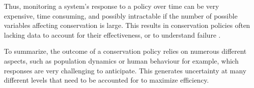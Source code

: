\documentclass[12pt,a4paper]{article}
\begin{document}
Thus, monitoring a system's response to a policy over time can be very expensive, time consuming, and possibly intractable if the number of possible variables affecting conservation is large.
This results in conservation policies often lacking data to account for their effectiveness, or to understand failure \citep{keith2011uncertainty}.


To summarize, %
the outcome of a conservation policy relies on numerous different aspects, such as population dynamics or human behaviour for example, which responses are very challenging to anticipate.
This generates uncertainty at many different levels that need to be accounted for to maximize efficiency.
\end{document}
